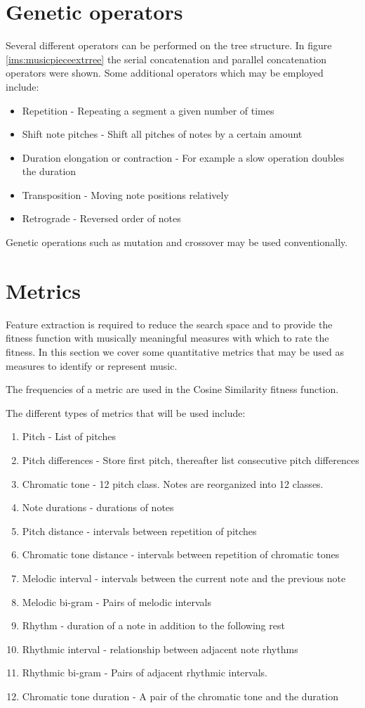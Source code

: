 \section{Genetic operators}
Several different operators can be performed on the tree structure. In figure \ref{ims:musicpieceextrree} the serial concatenation and parallel concatenation operators were shown.
Some additional operators which may be employed include:
\begin{itemize}
\item Repetition - Repeating a segment a given number of times
\item Shift note pitches - Shift all pitches of notes by a certain amount
\item Duration elongation or contraction - For example a slow operation doubles the duration
\item Transposition - Moving note positions relatively
\item Retrograde - Reversed order of notes
\end{itemize}

Genetic operations such as mutation and crossover may be used conventionally.

\section{Metrics} \label{chap:metrics}
Feature extraction is required to reduce the search space and to provide the fitness function with musically meaningful measures with which to rate the fitness. In this section we cover some quantitative metrics that may be used as measures to identify or represent music.

The frequencies of a metric are used in the Cosine Similarity fitness function.

The different types of metrics that will be used include:
\begin{enumerate}
\item Pitch - List of pitches
\item Pitch differences - Store first pitch, thereafter list consecutive pitch differences
\item Chromatic tone - 12 pitch class. Notes are reorganized into 12 classes.
\item Note durations - durations of notes
\item Pitch distance - intervals between repetition of pitches
\item Chromatic tone distance - intervals between repetition of chromatic tones  
\item Melodic interval - intervals between the current note and the previous note
\item Melodic bi-gram - Pairs of melodic intervals
\item Rhythm - duration of a note in addition to the following rest
\item Rhythmic interval - relationship between adjacent note rhythms
\item Rhythmic bi-gram - Pairs of adjacent rhythmic intervals.
\item Chromatic tone duration - A pair of the chromatic tone and the duration
\end{enumerate}

